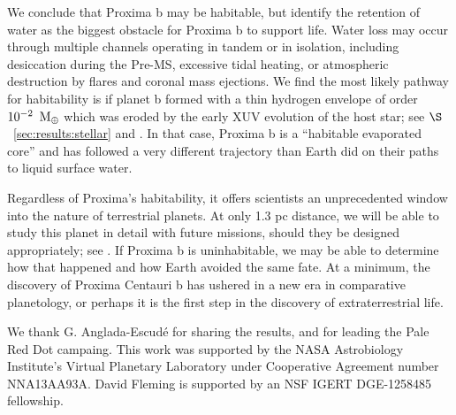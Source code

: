 \documentclass[preprint,12pt]{aastex}
\def\mearth{{\rm\,M_\oplus}}
\begin{document}
We conclude that Proxima b may be habitable, but identify the
retention of water as the biggest obstacle for Proxima b to support
life. Water loss may occur through multiple channels operating in
tandem or in isolation, including desiccation during the Pre-MS,
excessive tidal heating, or atmospheric destruction by flares and
coronal mass ejections. We find the most likely pathway for
habitability is if planet b formed with a thin hydrogen envelope of
order $10^{-2}~\mearth$ which was eroded by the early XUV evolution of
the host star; see $\S$~\ref{sec:results:stellar} and
\cite{Luger15}. In that case, Proxima b is a ``habitable evaporated
core'' and has followed a very different trajectory than Earth did on
their paths to liquid surface water.

Regardless of Proxima's habitability, it offers scientists an
unprecedented window into the nature of terrestrial planets. At only
1.3 pc distance, we will be able to study this planet in detail with
future missions, should they be designed appropriately; see
\cite{Meadows16}. If Proxima b is uninhabitable, we may be able to
determine how that happened and how Earth avoided the same fate. At a
minimum, the discovery of Proxima Centauri b has ushered in a new era
in comparative planetology, or perhaps it is the first step in the
discovery of extraterrestrial life.
 
\vspace{1cm} We thank G. Anglada-Escud{\' e} for sharing the results,
and for leading the Pale Red Dot campaing. This work was supported by
the NASA Astrobiology Institute's Virtual Planetary Laboratory under
Cooperative Agreement number NNA13AA93A.  David Fleming is supported
by an NSF IGERT DGE-1258485 fellowship.



\end{document}
